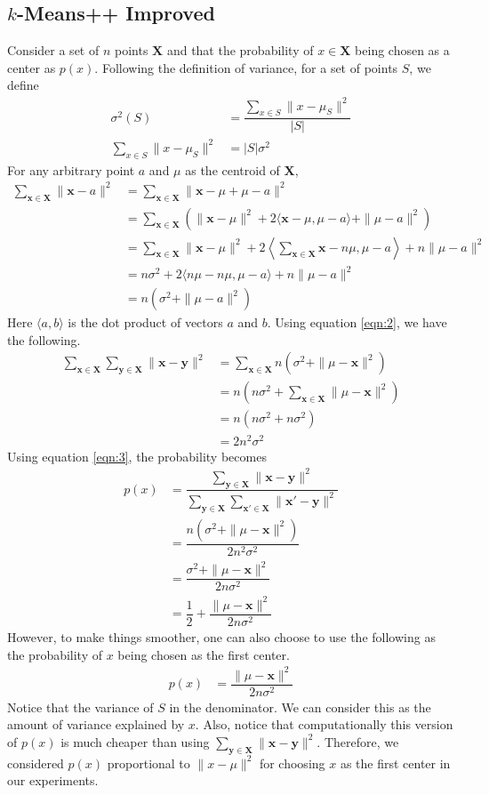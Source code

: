 \documentclass[twoside, 11pt]{article}
\newcommand{\x}{\mathbf{x}}
\newcommand{\X}{\mathbf{X}}
\newcommand{\y}{\mathbf{y}}
\begin{document}
	\subsection{$k$-Means++ Improved}
	Consider a set of $n$ points $\X$ and that the probability of $x\in\X$ being chosen as a center as $p(x)$. Following the definition of variance, for a set of points $S$, we define
		\begin{align}
			\sigma^2(S) & = \dfrac{\sum_{x\in S} \|x-\mu_{S}\|^2}{|S|}\nonumber\\
			\sum_{x\in S}\|x-\mu_{S}\|^2 & = |S|\sigma^2\label{eqn:1}
		\end{align}
	For any arbitrary point $a$ and $\mu$ as the centroid of $\X$,
		\begin{align}
			\sum_{\x\in\X}\|\x-a\|^2
				  & = \sum_{\x\in\X}\|\x-\mu+\mu-a\|^2\nonumber\\
				  & = \sum_{\x\in\X}\left(\|\x-\mu\|^2+2\langle\x-\mu,\mu-a\rangle+\|\mu-a\|^2\right)\nonumber\\
				  & = \sum_{\x\in\X}\|\x-\mu\|^2+2\left\langle\sum_{\x\in\X}\x-n\mu,\mu-a\right\rangle+n\|\mu-a\|^2\nonumber\\
				  & = n\sigma^2+2\langle n\mu-n\mu,\mu-a\rangle+n\|\mu-a\|^2\nonumber\\
				  & = n(\sigma^2+\|\mu-a\|^2)\label{eqn:2}
		\end{align}
	Here $\langle a,b\rangle$ is the dot product of vectors $a$ and $b$. Using equation \eqref{eqn:2}, we have the following.
		\begin{align}
			\sum_{\x\in\X}\sum_{\y\in\X}\|\x-\y\|^2 
				& = \sum_{\x\in\X}n(\sigma^2+\|\mu-\x\|^2)\nonumber\\
				& = n(n\sigma^2+\sum_{\x\in\X}\|\mu-\x\|^2)\nonumber\\
				& = n(n\sigma^2+n\sigma^2)\nonumber\\
				& = 2n^2\sigma^2\label{eqn:3}
		\end{align}
	Using equation \eqref{eqn:3}, the probability becomes
		\begin{align*}
			p(x) & = \dfrac{\sum_{\y\in\X}\|\x-\y\|^2}{\sum_{\y\in\X}\sum_{\x'\in\X}\|\x'-\y\|^2}\\
				 & = \dfrac{n(\sigma^2+\|\mu-\x\|^2)}{2n^2\sigma^2}\\
				 & = \dfrac{\sigma^2+\|\mu-\x\|^2}{2n\sigma^2}\\
				 & = \dfrac{1}{2}+\dfrac{\|\mu-\x\|^2}{2n\sigma^2}
		\end{align*}
	However, to make things smoother, one can also choose to use the following as the probability of $x$ being chosen as the first center.
		\begin{align*}
			p(x) & = \dfrac{\|\mu-\x\|^2}{2n\sigma^2}
		\end{align*}
	Notice that the variance of $S$ in the denominator. We can consider this as the amount of variance explained by $x$. Also, notice that computationally this version of $p(x)$ is much cheaper than using $\sum_{\y\in\X}\|\x-\y\|^2$. Therefore, we considered $p(x)$ proportional to $\|x-\mu\|^2$ for choosing $x$ as the first center in our experiments.
\end{document}
